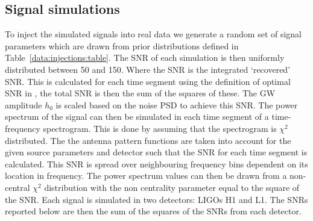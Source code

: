 \subsection{\label{machine:data:injections} Signal simulations}

%
To inject the simulated signals into real data we generate a random set of signal
parameters which are drawn from prior distributions defined in
Table~\ref{data:injections:table}. The \gls{SNR} of each simulation is then uniformly distributed between 50 and 150. Where the \gls{SNR} is the integrated `recovered' \gls{SNR}. This is calculated for each time segment using the definition of optimal \gls{SNR} in \cite{prix2007SearchContinuous}, the total \gls{SNR} is then the sum of the squares of these.
The \gls{GW} amplitude $h_{0}$ is scaled based on the noise \gls{PSD} to achieve this \gls{SNR}. 
The power spectrum of the signal can then be simulated in each time segment of a time-frequency spectrogram. This is done by assuming that the spectrogram is $\chi^2$ distributed.
The the antenna pattern functions are taken into account for the given source parameters and detector such that the \gls{SNR} for each time segment is calculated.
This \gls{SNR} is spread over neighbouring frequency bins dependent on its location in frequency.
The power spectrum values can then be drawn from a non-central $\chi^2$ distribution with the non centrality parameter equal to the square of the \gls{SNR}.
Each signal is simulated in two detectors: \glspl{LIGO} H1 and L1.
The \glspl{SNR} reported below are then the sum of the squares of the \glspl{SNR} from each detector.



